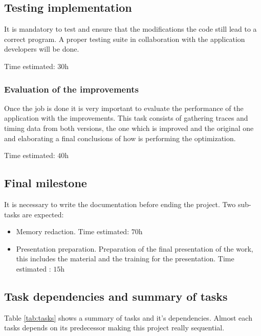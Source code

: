 \subsection{Testing implementation}
It is mandatory to test and ensure that the modifications the code still lead to a correct program. A proper testing suite in collaboration with the application developers will be done.

Time estimated: $\si{30\hour}$

\subsubsection{Evaluation of the improvements}
Once the job is done it is very important to evaluate the performance of the application with the improvements. This task consists of gathering traces and timing data from both versions, the one which is improved and the original one and elaborating a final conclusions of how is performing the optimization.

Time estimated: $\si{40\hour}$


\subsection{Final milestone}

It is necessary to write the documentation before ending the project. Two sub-tasks are expected:
\begin{itemize}
  \item Memory redaction. Time estimated: $\si{70\hour}$
  \item Presentation preparation. Preparation of the final presentation of the work, this includes the material and the training for the presentation. Time estimated : $\si{15\hour}$
\end{itemize}

\subsection{Task dependencies and summary of tasks}

Table \ref{tab:tasks} shows a summary of tasks and it's dependencies. Almost each tasks depends on its predecessor making this project really sequential.

